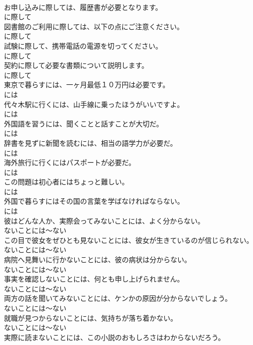 \documentclass[8pt]{extreport}
\begin{document}
\begin{CJK}{UTF8}{min}
\\	お申し込みに際しては、履歴書が必要となります。	
\\	に際して
\\	図書館のご利用に際しては、以下の点にご注意ください。	
\\	に際して
\\	試験に際して、携帯電話の電源を切ってください。	
\\	に際して
\\	契約に際して必要な書類について説明します。	
\\	に際して
\\	東京で暮らすには、一ヶ月最低１０万円は必要です。	
\\	には
\\	代々木駅に行くには、山手線に乗ったほうがいいですよ。	
\\	には
\\	外国語を習うには、聞くことと話すことが大切だ。	
\\	には
\\	辞書を見ずに新聞を読むには、相当の語学力が必要だ。	
\\	には
\\	海外旅行に行くにはパスポートが必要だ。	
\\	には
\\	この問題は初心者にはちょっと難しい。	
\\	には
\\	外国で暮らすにはその国の言葉を学ばなければならない。	
\\	には
\\	彼はどんな人か、実際会ってみないことには、よく分からない。	
\\	ないことには～ない
\\	この目で彼女をぜひとも見ないことには、彼女が生きているのが信じられない。	
\\	ないことには～ない
\\	病院へ見舞いに行かないことには、彼の病状は分からない。	
\\	ないことには～ない
\\	事実を確認しないことには、何とも申し上げられません。	
\\	ないことには～ない
\\	両方の話を聞いてみないことには、ケンかの原因が分からないでしょう。	
\\	ないことには～ない
\\	就職が見つからないことには、気持ちが落ち着かない。	
\\	ないことには～ない
\\	実際に読まないことには、この小説のおもしろさはわからないだろう。	

\end{CJK}
\end{document}
